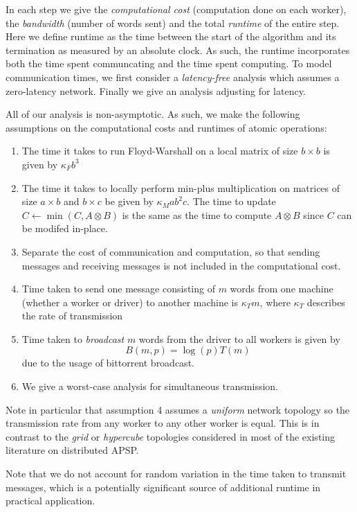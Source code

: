 \documentclass{article} %
\begin{document}
In each step we give the \emph{computational cost} (computation done
on each worker), the \emph{bandwidth} (number of words sent) and the
total \emph{runtime} of the entire step.  Here we define runtime as
the time between the start of the algorithm and its termination as
measured by an absolute clock. As such, the runtime incorporates both
the time spent communcating and the time spent computing.  To model
communication times, we first consider a \emph{latency-free} analysis
which assumes a zero-latency network.  Finally we give an analysis
adjusting for latency.

All of our analysis is non-asymptotic.  As such, we make the following
assumptions on the computational costs and runtimes of atomic
operations:

\begin{enumerate}
\item The time it takes to run Floyd-Warshall on a local matrix of size $b \times b$ is given by $\kappa_F b^3$
\item The time it takes to locally perform min-plus multiplication on
  matrices of size $a \times b$ and $b \times c$ be given by $\kappa_M
  ab^2c$. The time to update $C \leftarrow \min(C, A \otimes B)$ is the
  same as the time to compute $A \otimes B$ since $C$ can be modifed in-place.
\item Separate the cost of communication and computation, so that
  sending messages and receiving messages is not included in the
  computational cost.
\item Time taken to send one message consisting of $m$ words from one
  machine (whether a worker or driver) to another machine is $\kappa_T m$,
where $\kappa_T$ describes the rate of transmission
\item Time taken to \emph{broadcast} $m$ words from the driver to all workers is given by
\[
B(m, p) = \log(p) T(m)
\]
due to the usage of bittorrent broadcast.
\item We give a worst-case analysis for simultaneous transmission.
\end{enumerate}

Note in particular that assumption 4 assumes a \emph{uniform} network
topology so the transmission rate from any worker to any other worker
is equal.  This is in contrast to the \emph{grid} or \emph{hypercube}
topologies considered in most of the existing literature on
distributed APSP.

Note that we do not account for random variation in the time taken to
transmit messages, which is a potentially significant source of
additional runtime in practical application.
\end{document}
